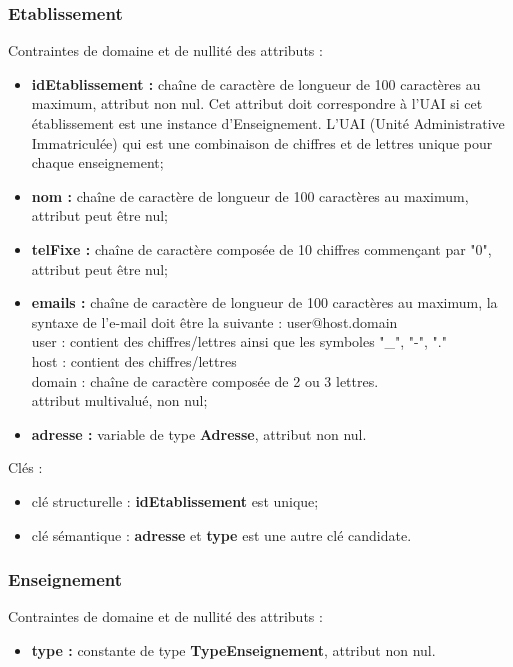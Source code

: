 \subsubsection*{Etablissement}
Contraintes de domaine et de nullité des attributs :
\begin{itemize}
 	\item \textbf{idEtablissement :} chaîne de caractère de longueur de 100 caractères au maximum, attribut non nul. Cet attribut doit correspondre à l'UAI si cet établissement est une instance d'Enseignement. L'UAI (Unité Administrative Immatriculée) qui est une combinaison de chiffres et de lettres unique pour chaque enseignement;
	\item \textbf{nom :} chaîne de caractère de longueur de 100 caractères au maximum, attribut peut être nul;
	\item \textbf{telFixe :} chaîne de caractère composée de 10 chiffres commençant par "0", attribut peut être nul;
	\item \textbf{emails :} chaîne de caractère de longueur de 100 caractères au maximum, la syntaxe de l'e-mail doit être la suivante : user@host.domain\\
	user : contient des chiffres/lettres ainsi que les symboles "\_", "-", "." \\
	host : contient des chiffres/lettres \\
	domain : chaîne de caractère composée de 2 ou 3 lettres. \\
	attribut multivalué, non nul; 
	\item \textbf{adresse :} variable de type \textbf{Adresse}, attribut non nul.\\
\end{itemize}  

Clés : 
\begin{itemize}
\item clé structurelle : \textbf{idEtablissement} est unique;
\item clé sémantique : \textbf{adresse} et \textbf{type} est une autre clé candidate. \\ 
\end{itemize}

\subsubsection*{Enseignement}
Contraintes de domaine et de nullité des attributs :
\begin{itemize}
	\item \textbf{type :} constante de type \textbf{TypeEnseignement}, attribut non nul.\\
\end{itemize}

